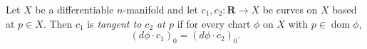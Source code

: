 Let $X$ be a differentiable $n$-manifold and let $c_1, c_2 \colon \mathbf{R} \to X$ be curves on $X$ based at $p \in X$. Then $c_1$ is \emph{tangent to $c_2$ at $p$} if for every chart $\phi$ on $X$ with $p \in \operatorname{dom} \phi$,
$$
(d\phi \cdot c_1)_0 = (d\phi \cdot c_2)_0.
$$
